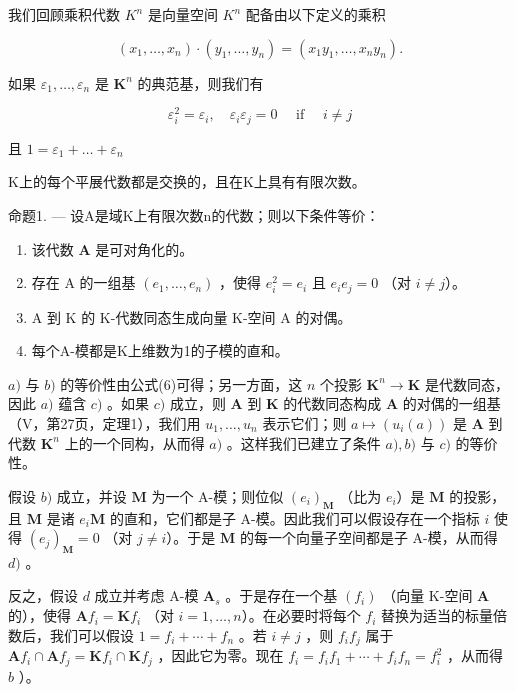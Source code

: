 我们回顾乘积代数 \(K^{n}\) 是向量空间 \(K^{n}\) 配备由以下定义的乘积

\[
\left(x _ {1}, \dots , x _ {n}\right) \cdot \left(y _ {1}, \dots , y _ {n}\right) = \left(x _ {1} y _ {1}, \dots , x _ {n} y _ {n}\right).\tag{5}
\]

如果 \(\varepsilon_1, \ldots, \varepsilon_n\) 是 \(\mathbf{K}^n\) 的典范基，则我们有

\[
\varepsilon_ {i} ^ {2} = \varepsilon_ {i}, \quad \varepsilon_ {i} \varepsilon_ {j} = 0 \quad \text { if } \quad i \neq j\tag{6}
\]

且 \(1 = \varepsilon_{1} + \dots +\varepsilon_{n}\)

K上的每个平展代数都是交换的，且在K上具有有限次数。

命题1. --- 设A是域K上有限次数n的代数；则以下条件等价：

\begin{enumerate}
\def\labelenumi{\alph{enumi})}
\item
  该代数 \(\mathbf{A}\) 是可对角化的。
\item
  存在 A 的一组基 \((e_1, \ldots, e_n)\) ，使得 \(e_i^2 = e_i\) 且 \(e_i e_j = 0\) （对 \(i \neq j\)）。
\item
  A 到 K 的 K-代数同态生成向量 K-空间 A 的对偶。
\item
  每个A-模都是K上维数为1的子模的直和。
\end{enumerate}

\(a)\) 与 \(b)\) 的等价性由公式(6)可得；另一方面，这 \(n\) 个投影 \(\mathbf{K}^n \to \mathbf{K}\) 是代数同态，因此 \(a)\) 蕴含 \(c)\) 。如果 \(c)\) 成立，则 \(\mathbf{A}\) 到 \(\mathbf{K}\) 的代数同态构成 \(\mathbf{A}\) 的对偶的一组基（V，第27页，定理1），我们用 \(u_1, \ldots, u_n\) 表示它们；则 \(a \mapsto (u_i(a))\) 是 \(\mathbf{A}\) 到代数 \(\mathbf{K}^n\) 上的一个同构，从而得 \(a)\) 。这样我们已建立了条件 \(a), b)\) 与 \(c)\) 的等价性。

假设 \(b)\) 成立，并设 \(\mathbf{M}\) 为一个 A-模；则位似 \((e_i)_{\mathbf{M}}\) （比为 \(e_i\)）是 \(\mathbf{M}\) 的投影，且 \(\mathbf{M}\) 是诸 \(e_i\mathbf{M}\) 的直和，它们都是子 A-模。因此我们可以假设存在一个指标 \(i\) 使得 \((e_j)_{\mathbf{M}} = 0\) （对 \(j \neq i\)）。于是 \(\mathbf{M}\) 的每一个向量子空间都是子 A-模，从而得 \(d)\) 。

反之，假设 \(d\) 成立并考虑 A-模 \(\mathbf{A}_{s}\) 。于是存在一个基 \((f_{i})\) （向量 K-空间 \(\mathbf{A}\) 的），使得 \(\mathbf{A}f_{i} = \mathbf{K}f_{i}\) （对 \(i = 1, \ldots, n\)）。在必要时将每个 \(f_{i}\) 替换为适当的标量倍数后，我们可以假设 \(1 = f_{i} + \cdots + f_{n}\) 。若 \(i \neq j\) ，则 \(f_{i}f_{j}\) 属于 \(\mathbf{A}f_{i} \cap \mathbf{A}f_{j} = \mathbf{K}f_{i} \cap \mathbf{K}f_{j}\) ，因此它为零。现在 \(f_{i} = f_{i}f_{1} + \cdots + f_{i}f_{n} = f_{i}^{2}\) ，从而得 \(b\) ）。

